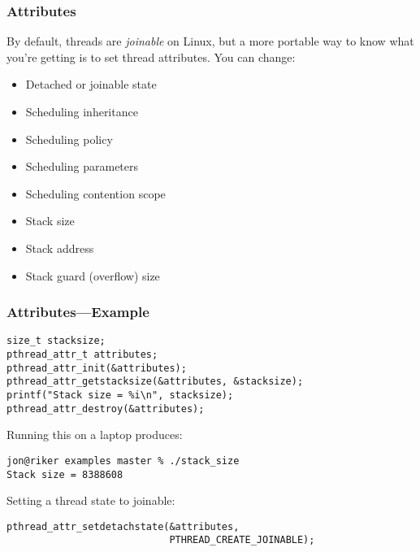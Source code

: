 \documentclass[aspectratio=43]{beamer}
\newenvironment{changemargin}[1]{%
  \begin{list}{}{%
    \setlength{\topsep}{0pt}%
    \setlength{\leftmargin}{#1}%
    \setlength{\rightmargin}{1em}
    \setlength{\listparindent}{\parindent}%
    \setlength{\itemindent}{\parindent}%
    \setlength{\parsep}{\parskip}%
  }%
  \item[]}{\end{list}}
\begin{document}
\begin{frame}
  \frametitle{Attributes}

\begin{changemargin}{1.5cm}
  By default, threads are {\it joinable} on Linux, but a more portable way to
  know what you're getting is to set thread attributes. You can change:
  \begin{itemize}
    \item Detached or joinable state
    \item Scheduling inheritance
    \item Scheduling policy
    \item Scheduling parameters
    \item Scheduling contention scope
    \item Stack size
    \item Stack address
    \item Stack guard (overflow) size
  \end{itemize}
\end{changemargin}

\end{frame}

\begin{frame}[fragile]
  \frametitle{Attributes---Example}

\begin{changemargin}{1.5cm}
  \begin{lstlisting}
size_t stacksize;
pthread_attr_t attributes;
pthread_attr_init(&attributes);
pthread_attr_getstacksize(&attributes, &stacksize);
printf("Stack size = %i\n", stacksize);
pthread_attr_destroy(&attributes);
  \end{lstlisting}
Running this on a laptop produces:
  \begin{lstlisting}
jon@riker examples master % ./stack_size 
Stack size = 8388608
  \end{lstlisting}
  Setting a thread state to joinable:
  \begin{lstlisting}
pthread_attr_setdetachstate(&attributes,
                            PTHREAD_CREATE_JOINABLE);
  \end{lstlisting}
\end{changemargin}

\end{frame}
\end{document}
